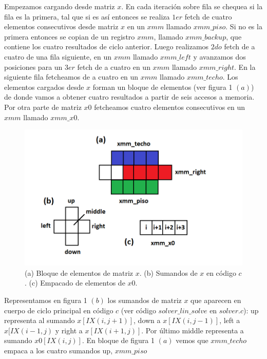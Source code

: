 \par Empezamos cargando desde matriz $x$.
 En cada iteración sobre fila se chequea si la fila es la primera, tal que si es así entonces 
 se realiza $1er$ fetch de cuatro elementos consecutivos desde matriz $x$ en un $xmm$ llamado $xmm\_piso$. Si no es la primera entonces se copian de un registro $xmm$, llamado $xmm\_backup$, que contiene los 
 cuatro resultados de ciclo anterior.
 Luego realizamos $2do$ fetch de a cuatro de una fila siguiente, en un $xmm$ llamado
 $xmm\_left$ y avanzamos dos posiciones para un $3er$ fetch de a cuatro en un $xmm$ llamado $xmm\_right$.
 En la siguiente fila fetcheamos de a cuatro en un $xmm$ llamado $xmm\_techo$. Los elementos cargados desde $x$ forman un bloque de elementos (ver figura 1 $(a)$) de donde vamos a obtener cuatro resultados a partir de seis accesos a memoria.
 Por otra parte de matriz $x0$ fetcheamos cuatro elementos consecutivos en un $xmm$ llamado $xmm\_x0$.\newline
\begin{figure}[h]

\centering
\includegraphics[scale=0.6] {celdas_xmm}
  
 \caption{(a) Bloque de elementos de matriz $x$. (b) Sumandos de $x$ en código $c$. (c) Empacado de elementos de $x0$.}
\end{figure} 
\par Representamos en figura 1 $(b)$ los sumandos de matriz $x$ que aparecen en cuerpo de ciclo principal 
 en código $c$ (ver código $solver\_lin\_solve$ en $solver.c$):
 up representa al sumando $x[IX(i,j+1)]$, down a $x[IX(i,j-1)]$, left a $x[IX(i-1,j)$ y right a 
 $x[IX(i+1,j)]$. Por último middle representa a sumando $x0[IX(i,j)]$. En bloque de figura 1 $(a)$ vemos que $xmm\_techo$ empaca a los cuatro sumandos up, $xmm\_piso$
